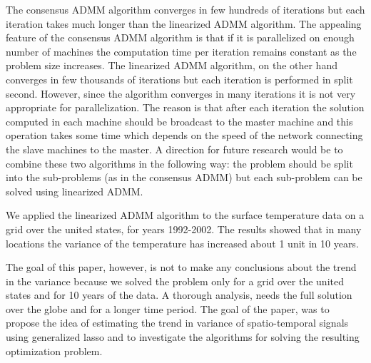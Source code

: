 \documentclass{article}
\begin{document}
The consensus ADMM algorithm converges in few hundreds of iterations
but each iteration takes much longer than the linearized ADMM
algorithm. The appealing feature of the consensus ADMM algorithm is
that if it is parallelized on enough number of machines the
computation time per iteration remains constant as the problem size
increases. The linearized ADMM algorithm, on the other hand converges
in few thousands of iterations but each iteration is performed in
split second. However, since the algorithm converges in many
iterations it is not very appropriate for parallelization. The reason
is that after each iteration the solution computed in each machine
should be broadcast to the master machine and this operation takes
some time which depends on the speed of the network connecting the
slave machines to the master. A direction for future research would be
to combine these two algorithms in the following way: the problem
should be split into the sub-problems (as in the consensus ADMM) but
each sub-problem can be solved using linearized ADMM. 

We applied the linearized ADMM algorithm to the surface temperature
data on a grid over the united states, for years 1992-2002. The
results showed that in many locations the variance of the temperature
has increased about 1 unit in 10 years. 

The goal of this paper, however, is not to make any conclusions about
the trend in the variance because we solved the problem only for a
grid over the united states and for 10 years of the data. A thorough
analysis, needs the full solution over the globe and for a longer time
period. The goal of the paper, was to propose the idea of estimating
the trend in variance of spatio-temporal signals using generalized
lasso and to investigate the algorithms for solving the resulting
optimization problem. 



\small

\end{document}
